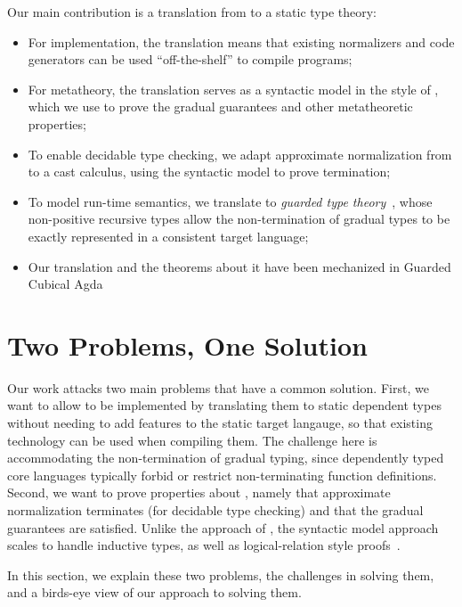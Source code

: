 Our main contribution is a translation from \lang to a static type theory:
\begin{itemize}
          \item For implementation, the translation means that existing normalizers
                and code generators can be used ``off-the-shelf'' to compile \lang programs;
  \item For metatheory, the translation serves as a syntactic model in the style of \citet{10.1145/3018610.3018620}, which we use to prove the gradual guarantees
        and other metatheoretic properties;
  \item To enable decidable type checking, we adapt approximate normalization
        from \citet{Eremondi:2019:ANG:3352468.3341692} to a cast calculus, using the syntactic
        model to prove termination;
  \item To model run-time semantics, we translate to \textit{guarded type theory}~\citep{TODO},
        whose non-positive recursive types allow the non-termination of gradual types to be
        exactly represented in a consistent target language;
  \item  Our translation and the theorems about it have been mechanized in Guarded Cubical Agda~\citep{TODO}
\end{itemize}

\section{Two Problems, One Solution}

Our work attacks two main problems that have a common solution.
First, we want to allow \lang to be implemented
by translating them to static dependent types without needing to add features to the static target langauge,
so that existing technology can be
used when compiling them.
The challenge here is accommodating the non-termination of gradual typing,
since dependently typed core languages typically forbid or restrict non-terminating function definitions.
Second, we want to prove properties about \lang, namely that approximate normalization
terminates (for decidable type checking) and that the gradual guarantees are satisfied.
Unlike the approach of \citet{Eremondi:2019:ANG:3352468.3341692}, the syntactic model
approach scales to handle inductive types, as well as logical-relation
style proofs~\citep{10.1017/S0956796812000056}.

In this section, we explain these two problems, the challenges in solving
them, and a birds-eye view of our approach to solving them.


